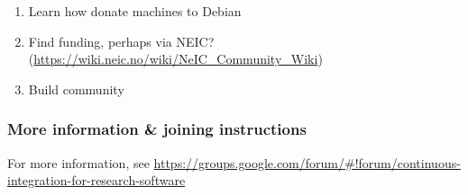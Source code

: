 \begin{enumerate}
\item Learn how donate machines to Debian
\item Find funding, perhaps via NEIC? (\url{https://wiki.neic.no/wiki/NeIC_Community_Wiki}) 
\item Build community
\end{enumerate}


\subsubsection{More information \& joining instructions}

For more information, see \url{https://groups.google.com/forum/#!forum/continuous-integration-for-research-software}

